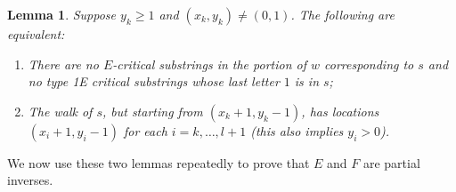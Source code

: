 \documentclass[10pt]{amsart}
\newtheorem{lemma}[theorem]{Lemma}
\theoremstyle{definition}
\begin{document}
\begin{lemma} \label{lem:shifting-walks-E}
Suppose $y_k\ge 1$ and $(x_k,y_k)\neq (0,1)$. The following are equivalent:
\begin{enumerate}[label={(\roman*)}]
\item %
There are no $E$-critical substrings in the portion of $w$ corresponding to $s$ and no type 1E critical substrings whose last letter $1$ is in $s$;
\item %
The walk of $s$, but starting from $(x_k+1,y_k-1)$, has locations $(x_i+1,y_i-1)$ for each $i = k, \ldots, l+1$ \textup{(}this also implies $y_i > 0$\textup{)}.
\end{enumerate}
\end{lemma}

We now use these two lemmas repeatedly to prove that $E$ and $F$ are partial inverses.
\end{document}
